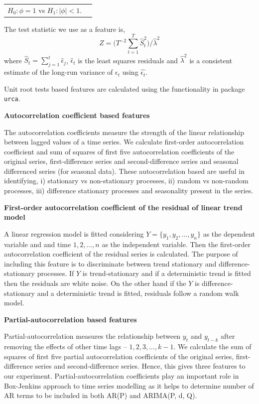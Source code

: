 \documentclass[11pt,a4paper,]{article}
\theoremstyle{definition}
\theoremstyle{definition}
\theoremstyle{definition}
\theoremstyle{remark}
\begin{document}
\begin{table}[!h]
\centering
\begin{tabular}{rl}
$H_0: \phi = 1$ vs
$H_1: |\phi| < 1$. 
\end{tabular}
\end{table}

The test statistic we use as a feature is,
\[Z=\big( T^{-2}\sum_{t=1}^{T}\hat{S}_t^2\big)/\hat{\lambda}^2\] where
\(\hat{S}_t=\sum_{j=1}^t\hat{\epsilon}_j\), \(\hat{\epsilon}_t\) is the
least squares residuals and \(\hat{\lambda}^2\) is a consistent estimate
of the long-run variance of \(\epsilon_t\) using \(\hat{\epsilon_t}\).

Unit root tests based features are calculated using the functionality in
package \texttt{urca}\autocite{pfaff2016package}.

\textbf{Autocorrelation coefficient based features}

The autocorrelation coefficients measure the strength of the linear
relationship between lagged values of a time series. We calculate
first-order autocorrelation coefficient and sum of squares of first five
autocorrelation coefficients of the original series, first-difference
series and second-difference series and seasonal differenced series (for
seasonal data). These autocorrelation based are useful in identifying,
i) stationary vs non-stationary processes, ii) random vs non-random
processes, iii) difference stationary processes and seasonality present
in the series.

\textbf{First-order autocorrelation coefficient of the residual of
linear trend model}

A linear regression model is fitted considering
\(Y = \{y_1, y_2, \dots, y_n\}\) as the dependent variable and and time
\(1, 2,\dots, n\) as the independent variable. Then the first-order
autocorrelation coefficient of the residual series is calculated. The
purpose of including this feature is to discriminate between trend
stationary and difference-stationary processes. If \(Y\) is
trend-stationary and if a deterministic trend is fitted then the
residuals are white noise. On the other hand if the \(Y\) is
difference-stationary and a deterministic trend is fitted, residuals
follow a random walk model.

\textbf{Partial-autocorrelation based features}

Partial-autocorrelation measures the relationship between \(y_t\) and
\(y_{t-k}\) after removing the effects of other time lags --
\(1, 2, 3, \dots, k-1\). We calculate the sum of squares of first five
partial autocorrelation coefficients of the original series,
first-difference series and second-difference series. Hence, this gives
three features to our experiment. Partial-autocorrelation coefficients
play an important role in Box-Jenkins\autocite{box2015time} approach to
time series modelling as it helps to determine number of AR terms to be
included in both AR(P) and ARIMA(P, d, Q).

\newpage

\printbibliography[title=References]
\end{document}
